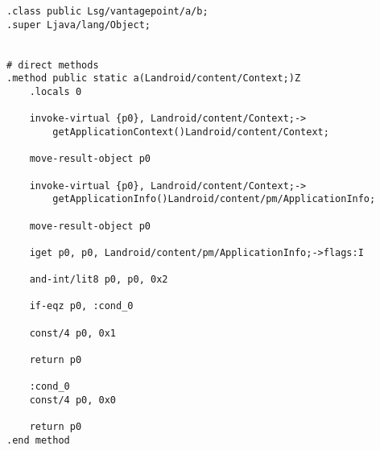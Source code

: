 \begin{verbatim}
.class public Lsg/vantagepoint/a/b;
.super Ljava/lang/Object;


# direct methods
.method public static a(Landroid/content/Context;)Z
    .locals 0

    invoke-virtual {p0}, Landroid/content/Context;->
        getApplicationContext()Landroid/content/Context;

    move-result-object p0

    invoke-virtual {p0}, Landroid/content/Context;->
        getApplicationInfo()Landroid/content/pm/ApplicationInfo;

    move-result-object p0

    iget p0, p0, Landroid/content/pm/ApplicationInfo;->flags:I

    and-int/lit8 p0, p0, 0x2

    if-eqz p0, :cond_0

    const/4 p0, 0x1

    return p0

    :cond_0
    const/4 p0, 0x0

    return p0
.end method
\end{verbatim}
